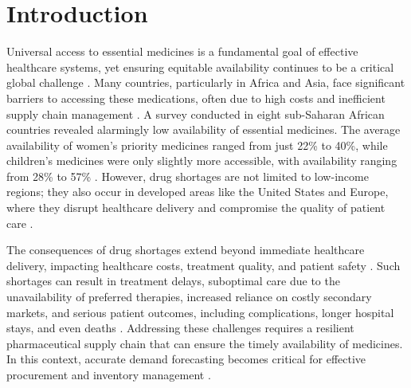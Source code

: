 \documentclass[
  authoryear,
  preprint,
  3p]{elsarticle}
\begin{document}
\section{Introduction}\label{sec-intro}

Universal access to essential medicines is a fundamental goal of
effective healthcare systems, yet ensuring equitable availability
continues to be a critical global challenge
\citep{quick2003essential, world2004annual}. Many countries,
particularly in Africa and Asia, face significant barriers to accessing
these medications, often due to high costs and inefficient supply chain
management \citep{world2004medicines}. A survey conducted in eight
sub-Saharan African countries revealed alarmingly low availability of
essential medicines. The average availability of women's priority
medicines ranged from just 22\% to 40\%, while children's medicines were
only slightly more accessible, with availability ranging from 28\% to
57\% \citep{droti2019poor}. However, drug shortages are not limited to
low-income regions; they also occur in developed areas like the United
States and Europe, where they disrupt healthcare delivery and compromise
the quality of patient care
\citep{fox2003managing, kaakeh2011impact, johnson2011drug, huys2013european, le2011prevalence}.

The consequences of drug shortages extend beyond immediate healthcare
delivery, impacting healthcare costs, treatment quality, and patient
safety \citep{alspach2012drug, kaakeh2011impact, baumer2004national}.
Such shortages can result in treatment delays, suboptimal care due to
the unavailability of preferred therapies, increased reliance on costly
secondary markets, and serious patient outcomes, including
complications, longer hospital stays, and even deaths
\citep{alspach2012drug}. Addressing these challenges requires a
resilient pharmaceutical supply chain that can ensure the timely
availability of medicines. In this context, accurate demand forecasting
becomes critical for effective procurement and inventory management
\citep{subramanian2021effective}.
\end{document}
